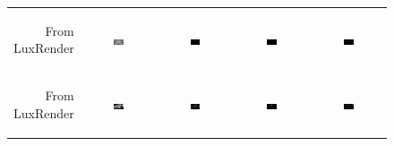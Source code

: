 \begin{figure}[t!bp]
\begin{tabular}{@{}r@{ } c@{ } c@{ } c@{ } c }
		\begin{sideways} \parbox[b]{15mm} {\small{From\\ LuxRender}} \end{sideways} &
		\includegraphics[width=0.15\textwidth]{figs/4_results/teapot/1_from_lux.png} &
		\includegraphics[width=0.15\textwidth]{figs/4_results/teapot/diff_lux-mitsuba.png} &
		\includegraphics[width=0.15\textwidth]{figs/4_results/teapot/diff_lux-pbrt.png} &
		\includegraphics[width=0.15\textwidth]{figs/4_results/teapot/diff_mitsuba-pbrt.png} \\
		
		\begin{sideways} \parbox[b]{15mm} {\small{From\\ LuxRender}} \end{sideways} &
		\includegraphics[width=0.15\textwidth]{figs/4_results/dining_room/1_from_lux.png} &
		\includegraphics[width=0.15\textwidth]{figs/4_results/dining_room/diff_lux-mitsuba.png} &
		\includegraphics[width=0.15\textwidth]{figs/4_results/dining_room/diff_lux-pbrt.png} &
		\includegraphics[width=0.15\textwidth]{figs/4_results/dining_room/diff_mitsuba-pbrt.png} \\
		

\end{tabular}
\end{figure}
